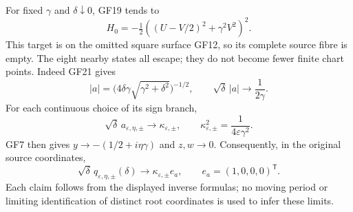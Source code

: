 For fixed $\gamma$ and $\delta\downarrow0$, GF19 tends to
\begin{equation}
 H_0=-\tfrac12\left((U-V/2)^2+\gamma^2V^2\right)^2.\tag{GF23}
\end{equation}
This target is on the omitted square surface GF12, so its complete
source fibre is empty. The eight nearby states all escape; they
do not become fewer finite chart points. Indeed GF21 gives
\[
 |a|=\bigl(4\delta\gamma\sqrt{\gamma^2+\delta^2}\bigr)^{-1/2},
 \qquad \sqrt\delta\,|a|\longrightarrow\frac1{2\gamma}.
\]
For each continuous choice of its sign branch,
\begin{equation}
 \sqrt\delta\,a_{\varepsilon,\eta,\pm}\longrightarrow
 \kappa_{\varepsilon,\pm},\qquad
 \kappa_{\varepsilon,\pm}^2=\frac1{4\varepsilon\gamma^2}.
 \tag{GF24}
\end{equation}
GF7 then gives
$y\to-(1/2+i\eta\gamma)$ and $z,w\to0$. Consequently, in
the original source coordinates,
\begin{equation}
 \sqrt\delta\,q_{\varepsilon,\eta,\pm}(\delta)
       \longrightarrow\kappa_{\varepsilon,\pm}e_a,
 \qquad e_a=(1,0,0,0)^{\mathsf T}.\tag{GF25}
\end{equation}
Each claim follows from the displayed inverse formulas; no moving
period or limiting identification of distinct root coordinates is
used to infer these limits.

